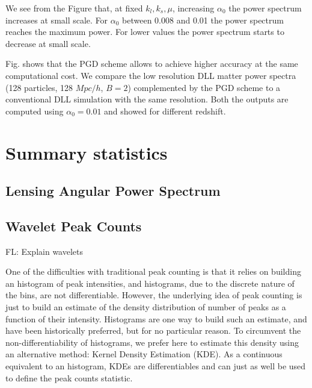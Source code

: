 \documentclass[twocolumn,twocolappendix]{aastex63}
\newcommand{\EiffL}[1]{{\color{cyan}FL: #1}}
\begin{document}
We see from the Figure that, at fixed $k_l,k_s,\mu$, increasing $\alpha_0$ the power spectrum increases at small scale. For $\alpha_0$ between 0.008 and 0.01 the power spectrum reaches the maximum power. For lower values the power spectrum starts to decrease at small scale. 

Fig. shows that the PGD scheme allows to achieve higher accuracy at the same computational cost. We compare the low resolution DLL matter power spectra (128 particles, 128 $Mpc/h$, $B=2$) complemented by the PGD scheme to a conventional DLL simulation with the same resolution. Both the outputs are computed using $\alpha_0=0.01$ and showed for different redshift. 




\section{Summary statistics}

\subsection{Lensing Angular Power Spectrum}


\subsection{Wavelet Peak Counts}

\EiffL{Explain wavelets}

One of the difficulties with traditional peak counting is that it relies on building
an histogram of peak intensities, and histograms, due to the discrete nature of the bins, are not differentiable. However, the underlying idea of peak counting is just to build an estimate of the density distribution of number of peaks as a function of their intensity. Histograms are one way to build such an estimate, and have been historically preferred, but for no particular reason. To circumvent the non-differentiability of histograms, we prefer here to estimate this density using an alternative method: Kernel Density Estimation (KDE). As a continuous equivalent to an histogram, KDEs are differentiables and can just as well be used to define the peak counts statistic.
\end{document}
